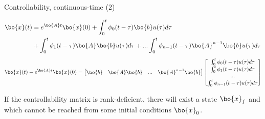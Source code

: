 \documentclass{beamer}
\begin{document}
\begin{frame}{Controllability, continuous-time (2)}
	\begin{flushleft}
		
		\begin{align*}
			\bo{x}(t) &= e^{\bo{A}t}  \bo{x}(0) + 
			\int_{0}^{t} \phi_0(t-\tau)\bo{b} u(\tau) d\tau
			\\
			&+
			\int_{0}^{t} \phi_1(t-\tau)\bo{A}\bo{b}  u(\tau) d\tau+ ... 
		    \int_{0}^{t} \phi_{n-1}(t-\tau) \bo{A}^{n-1} 
			\bo{b}  u(\tau) d\tau 
		\end{align*}
		\begin{align*}
		\bo{x}(t) -  e^{\bo{A}t}  \bo{x}(0) = 
		\begin{bmatrix}
			\bo{b} & \bo{A}\bo{b}& ... &\bo{A}^{n-1}\bo{b}
		\end{bmatrix}
		\begin{bmatrix}
			\int_{0}^{t} \phi_0(t-\tau) u(\tau) d\tau \\
			\int_{0}^{t} \phi_1(t-\tau) u(\tau) d\tau \\
			... \\
			\int_{0}^{t} \phi_{n-1}(t-\tau) u(\tau) d\tau \\
		\end{bmatrix}
		\end{align*}
		
		If the controllability matrix is rank-deficient, there will exist a state $\bo{x}_f$ and which cannot be reached from some initial conditions $\bo{x}_0$.
		
	\end{flushleft}
\end{frame}
\end{document}
